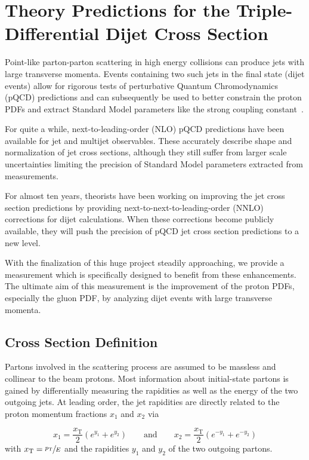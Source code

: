 
\chapter{Theory Predictions for the Triple-Differential Dijet Cross Section}
\label{theory_predictions}

Point-like parton-parton scattering in high energy collisions can produce
jets with large transverse momenta. Events containing two such jets  in the
final state (dijet events) allow for rigorous tests of perturbative Quantum
Chromodynamics (pQCD) predictions and can subsequently be used to better
constrain the proton PDFs and extract Standard Model parameters like the strong
coupling constant~\as.

For quite a while, next-to-leading-order (NLO) pQCD predictions have been available
for jet and multijet observables. These accurately describe shape and
normalization of jet cross sections, although they still suffer from larger scale
uncertainties limiting the precision of Standard Model parameters extracted from
measurements.

For almost ten years, theorists have been working on improving the jet cross
section predictions by providing next-to-next-to-leading-order (NNLO) corrections for
dijet calculations. When these corrections become publicly available, they will
push the precision of pQCD jet cross section predictions to a new level.

With the finalization of this huge project steadily approaching, we provide a
measurement which is specifically designed to benefit from these enhancements.
The ultimate aim of this measurement is the improvement of the proton PDFs,
especially the gluon PDF, by analyzing dijet events with large transverse momenta.

\section{Cross Section Definition}

Partons involved in the scattering process are assumed to be massless and
collinear to the beam protons. Most information about initial-state partons
is gained by differentially measuring the rapidities as well as the energy of
the two outgoing jets. At leading order, the jet rapidities are directly
related to the proton momentum fractions $x_1$ and $x_2$ via

\begin{equation*}
    x_1 = \frac{x_\mathrm{T}}{2} \left( e^{y_1} + e^{y_2} \right)
    \qquad\text{and}\qquad x_2 = \frac{x_\mathrm{T}}{2} \left( e^{-y_1} +
    e^{-y_2} \right)
\end{equation*}
with $x_{\mathrm{T}} = \sfrac{p_{\mathrm{T}}}{E}$ and the rapidities $y_1$ and $y_2$ of the two outgoing
partons.

